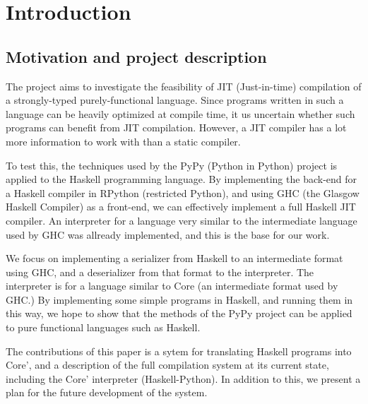 
\chapter{Introduction}

\section{Motivation and project description}

The project aims to investigate the feasibility of JIT (Just-in-time) 
compilation of a strongly-typed purely-functional language. Since
programs written in such a language can be heavily optimized at 
compile time, it us uncertain whether such programs can benefit from
JIT compilation. However, a JIT compiler has a lot more information to
work with than a static compiler. 

To test this, the techniques 
used by the PyPy (Python in Python) project is applied to the Haskell 
programming language. By implementing the back-end for a Haskell compiler 
in RPython (restricted Python), and using GHC (the Glasgow Haskell Compiler) 
as a front-end, we can effectively implement a full Haskell JIT compiler. An 
interpreter for a language very similar to the intermediate language used
by GHC was allready implemented, and this is the base for our work.

We focus on implementing a serializer from Haskell to an intermediate
format using GHC, and a deserializer from that format to the interpreter. The 
interpreter is for a language similar to Core (an intermediate format used by GHC.)
By implementing some simple programs in Haskell, and running them in this way, 
we hope to show that the methods of the PyPy project can be applied to pure 
functional languages such as Haskell.

The contributions of this paper is a sytem for translating Haskell programs
into Core', and a description of the full compilation system at its current
state, including the Core' interpreter (Haskell-Python). In addition to this,
we present a plan for the future development of the system.







